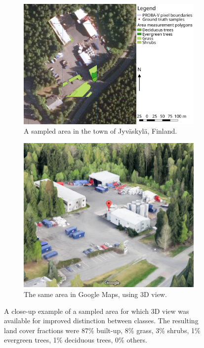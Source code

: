 \documentclass[a4paper,12pt]{scrbook}
\begin{document}
\begin{figure}
  \centering
  \begin{subfigure}[b]{0.7\textwidth}
   \includegraphics[width=\textwidth]{./thesis-figures/sample-example.png}
   \caption{A sampled area in the town of Jyv\"askyl\"a, Finland.}
  \end{subfigure}
  \begin{subfigure}[b]{0.65\textwidth}
   \includegraphics[width=\textwidth]{./thesis-figures/sample-3d.png}
   \caption{The same area in Google Maps, using 3D view.}
  \end{subfigure}
  \caption{A close-up example of a sampled area for which 3D view was available for improved distinction between classes. The resulting land cover fractions were 87\% built-up, 8\% grass, 3\% shrubs, 1\% evergreen trees, 1\% deciduous trees, 0\% others.}
  \label{fig-sampling-detailed}
\end{figure}
\end{document}

